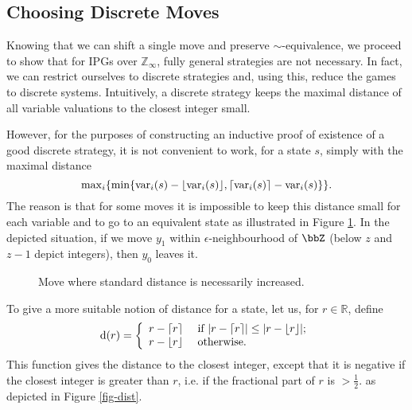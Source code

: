 \documentclass[fleqn,envcountsame]{LMCS}
\newcommand{\ie}{i.e.\xspace}
\newcommand{\Zinf}{\ensuremath{\mathbb{Z}_{\infty}}}
\newcommand{\setR}{\ensuremath{\mathbb{R}}}
\newcommand{\floor}[1]{\ensuremath{\lfloor #1 \rfloor}}
\newcommand{\ceil}[1]{\ensuremath{\lceil #1 \rceil}}
\renewcommand{\max}{\mathrm{max}}
\begin{document}
\subsection{Choosing Discrete Moves}\label{subsec_choose}

Knowing that we can shift a single move and preserve $\sim$-equivalence,
we proceed to show that for IPGs over $\Zinf$, fully general strategies are
not necessary. In fact, we can restrict ourselves to discrete strategies
and, using this, reduce the games to discrete systems.
Intuitively, a discrete strategy keeps the maximal distance of 
all variable valuations to the closest integer small.

However, for the purposes of constructing an inductive proof 
of existence of a good discrete strategy,
it is not convenient to work, for a state $s$, simply with the maximal distance
\[ \max_i \{ \min \{ \var_i(s) - \floor{\var_i(s)},
                   \ceil{\var_i(s)} - \var_i(s) \} \}. \]
The reason is that for some moves it is impossible to keep this distance
small for each variable and to go to an equivalent state as illustrated
in Figure \ref{fig-prob}. In the depicted situation, if we move $y_1$ within
$\epsilon$-neighbourhood of $\bbZ$ (below $z$ and $z-1$ depict integers),
then $y_0$ leaves it.

\begin{figure}[h]
\begin{center}
\end{center}
\caption{Move where standard distance is necessarily increased.}
\label{fig-prob}
\end{figure}

\noindent To give a more suitable notion of distance for a state,
let us, for $r \in \setR$, define
\begin{displaymath}
\di(r) = \left\{
\begin{array}{ll} 
r-\ceil{r} & 
    \text{ if } |r-\ceil{r}| \leq |r-\floor{r}|; \\
r-\floor{r} & 
    \text{ otherwise.}
\end{array} \right.
\end{displaymath}
This function gives the distance to the closest integer, except
that it is negative if the closest integer is greater than $r$,
\ie if the fractional part of $r$ is $> \frac{1}{2}$.
as depicted in Figure \ref{fig-dist}.
\end{document}
